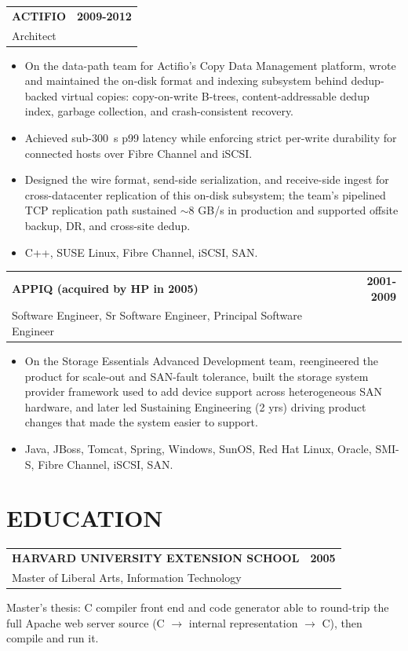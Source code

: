 \documentclass[11pt]{article}
\makeatletter
\newcommand{\resheader}[1]{\section*{#1}\vspace{-4pt}}
\newcommand{\jobheading}[4]{%
  \vspace{6pt}\begin{tabularx}{\textwidth}{@{}X r@{}}
    {\textbf{#1}} & {\textbf{#2}} \\
    {{\normalsize #3}\hspace{0.5em}{\color{muted}·}\hspace{0.5em}{\color{muted}#4}} & {} \\
  \end{tabularx}\vspace{2pt}
}
\makeatother
\begin{document}
\jobheading{ACTIFIO}{2009-2012}{Architect}{Waltham, MA}
\begin{itemize}
\item On the data-path team for Actifio's Copy Data Management platform, wrote and maintained the on-disk format and indexing subsystem behind dedup-backed virtual copies: copy-on-write B-trees, content-addressable dedup index, garbage collection, and crash-consistent recovery.
\item Achieved sub-300~\textmu s p99 latency while enforcing strict per-write durability for connected hosts over Fibre Channel and iSCSI.
\item Designed the wire format, send-side serialization, and receive-side ingest for cross-datacenter replication of this on-disk subsystem; the team's pipelined TCP replication path sustained $\sim$8 GB/s in production and supported offsite backup, DR, and cross-site dedup.
\item C++, SUSE Linux, Fibre Channel, iSCSI, SAN.
\end{itemize}

\jobheading{APPIQ (acquired by HP in 2005)}{2001-2009}{Software Engineer, Sr Software Engineer, Principal Software Engineer}{Marlborough, MA}
\begin{itemize}
\item On the Storage Essentials Advanced Development team, reengineered the product for scale-out and SAN-fault tolerance, built the storage system provider framework used to add device support across heterogeneous SAN hardware, and later led Sustaining Engineering (2 yrs) driving product changes that made the system easier to support.
\item Java, JBoss, Tomcat, Spring, Windows, SunOS, Red Hat Linux, Oracle, SMI-S, Fibre Channel, iSCSI, SAN.
\end{itemize}

\resheader{EDUCATION}

\jobheading{HARVARD UNIVERSITY EXTENSION SCHOOL}{2005}{Master of Liberal Arts, Information Technology}{Cambridge, MA}

Master's thesis: C compiler front end and code generator able to round-trip the full Apache web server source (C $\to$ internal representation $\to$ C), then compile and run it.
\end{document}

